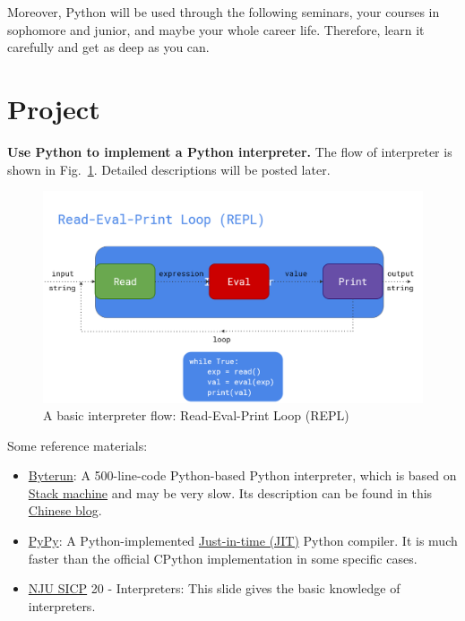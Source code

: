 \documentclass[english]{../TexTemplate/thesis}
\begin{document}
Moreover, Python will be used through the following seminars, your courses in sophomore and junior, and maybe your whole career life.
Therefore, learn it carefully and get as deep as you can.

\section{Project}
\textbf{Use Python to implement a Python interpreter.}
The flow of interpreter is shown in Fig.~\ref{fig:flow}.
Detailed descriptions will be posted later.

\begin{figure}[H]
\centering
\includegraphics[width=0.8\linewidth]{fig/repl.png}
\caption{A basic interpreter flow: Read-Eval-Print Loop (REPL)}
\label{fig:flow}
\end{figure}

Some reference materials:
\begin{itemize}
	\item \href{https://github.com/aosabook/500lines/tree/master/interpreter}{Byterun}: A 500-line-code Python-based Python interpreter, which is based on \href{https://en.wikipedia.org/wiki/Stack_machine}{Stack machine} and may be very slow. Its description can be found in this \href{http://qingyunha.github.io/taotao/}{Chinese blog}.
	\item \href{https://pypy.org/}{PyPy}: A Python-implemented \href{https://en.wikipedia.org/wiki/Just-in-time_compilation}{Just-in-time (JIT)} Python compiler. It is much faster than the official CPython implementation in some specific cases.
	\item \href{https://cs.nju.edu.cn/xyfeng/teaching/SICP/lectureNotes/20-Interpreters.pptx}{NJU SICP} 20 - Interpreters: This slide gives the basic knowledge of interpreters.
\end{itemize}
\end{document}
